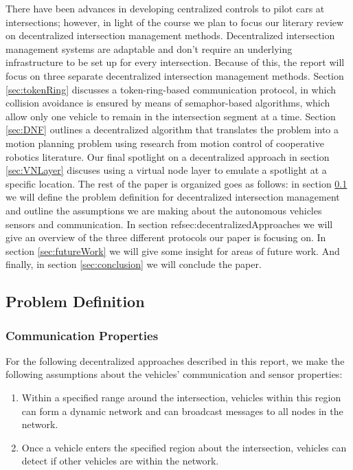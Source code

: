 \documentclass[12pt]{article}
\begin{document}
There have been advances in developing centralized controls to pilot cars at intersections; however, in light of the course we plan to focus our literary review on decentralized intersection management methods.  Decentralized intersection management systems are adaptable and don't require an underlying infrastructure to be set up for every intersection.  %
Because of this, the report will focus on three separate decentralized intersection management methods. 
Section \ref{sec:tokenRing}  discusses a token-ring-based communication protocol, in which  collision avoidance is ensured by means of semaphor-based algorithms, which allow only one vehicle to remain in the intersection segment at a time.  Section \ref{sec:DNF} outlines a decentralized algorithm that translates the problem into a motion planning problem using research from motion control of cooperative robotics literature.  Our final spotlight on a decentralized approach in section \ref{sec:VNLayer} discuses using a virtual node layer to emulate a  spotlight at a specific location.  
The rest of the  paper is organized  goes as follows: in section \ref{sec:problemDefinition} we will define the problem definition for decentralized intersection management and outline the assumptions we are making about the autonomous vehicles sensors and communication.  In section ref{sec:decentralizedApproaches} we will give an overview of the three different protocols our paper is focusing on.  In section \ref{sec:futureWork} we will give some insight for areas of future work.  And finally, in section \ref{sec:conclusion} we will conclude the paper.

\subsection{Problem Definition}
\label{sec:problemDefinition}
\subsubsection{Communication Properties}
For the following decentralized approaches described in this report, we make the following assumptions about the vehicles' communication and sensor properties:
\begin{enumerate}
\item Within a specified range around the intersection, vehicles within this region can form a dynamic network and can broadcast messages to all nodes in the network.
\item
Once a vehicle enters the specified region about the intersection, vehicles can detect if other vehicles are within the network.  
\end{enumerate}
\end{document}
